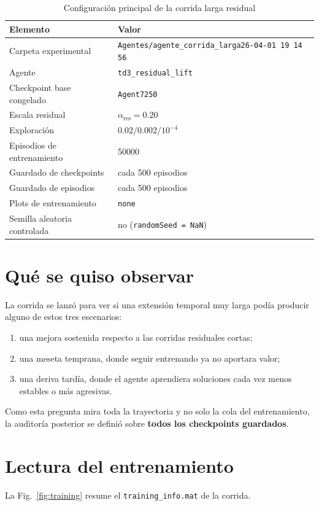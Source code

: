\documentclass[11pt,a4paper]{article}
\begin{document}
\begin{table}[H]
\centering
\caption{Configuraci\'on principal de la corrida larga residual}
\begin{tabularx}{\linewidth}{lY}
\toprule
Elemento & Valor \\
\midrule
Carpeta experimental & \texttt{Agentes/agente\_corrida\_larga26-04-01 19 14 56} \\
Agente & \texttt{td3\_residual\_lift} \\
Checkpoint base congelado & \texttt{Agent7250} \\
Escala residual & $\alpha_{\mathrm{res}} = 0.20$ \\
Exploraci\'on & $0.02 / 0.002 / 10^{-4}$ \\
Episodios de entrenamiento & 50000 \\
Guardado de checkpoints & cada 500 episodios \\
Guardado de episodios & cada 500 episodios \\
Plots de entrenamiento & \texttt{none} \\
Semilla aleatoria controlada & no (\texttt{randomSeed = NaN}) \\
\bottomrule
\end{tabularx}
\end{table}

\section*{Qu\'e se quiso observar}
La corrida se lanz\'o para ver si una extensi\'on temporal muy larga pod\'ia producir alguno de estos tres escenarios:
\begin{enumerate}
    \item una mejora sostenida respecto a las corridas residuales cortas;
    \item una meseta temprana, donde seguir entrenando ya no aportara valor;
    \item una deriva tard\'ia, donde el agente aprendiera soluciones cada vez menos estables o m\'as agresivas.
\end{enumerate}

Como esta pregunta mira toda la trayectoria y no solo la cola del entrenamiento, la auditor\'ia posterior se defini\'o sobre \textbf{todos los checkpoints guardados}.

\section*{Lectura del entrenamiento}
La Fig.~\ref{fig:training} resume el \texttt{training\_info.mat} de la corrida.
\end{document}

